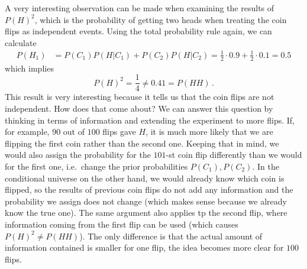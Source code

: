 \begin{ex}
A very interesting observation can be made when examining the results of $P(H)^2$, which is the probability of getting two heads when treating the coin flips as independent events. Using the total probability rule again, we can calculate
\begin{align*}
P(H_1) &= P(C_1) P(H | C_1) + P(C_2) P(H | C_2) = \frac{1}{2} \cdot 0.9 + \frac{1}{2} \cdot 0.1 = 0.5
\end{align*}
which implies
\begin{equation*}
P(H)^2 = \frac{1}{4} \neq 0.41 = P(HH) \, .
\end{equation*}
This result is very interesting because it tells us that the coin flips are not independent. How does that come about? We can answer this question by thinking in terms of information and extending the experiment to more flips. If, for example, $90$ out of $100$ flips gave $H$, it is much more likely that we are flipping the first coin rather than the second one. Keeping that in mind, we would also assign the probability for the $101$-st coin flip differently than we would for the first one, i.e.~change the prior probabilities $P(C_1), P(C_2)$. In the conditional universe on the other hand, we would already know which coin is flipped, so the results of previous coin flips do not add any information and the probability we assign does not change (which makes sense because we already know the true one). The same argument also applies tp the second flip, where information coming from the first flip can be used (which causes $P(H)^2 \neq P(HH)$). The only difference is that the actual amount of information contained is smaller for one flip, the idea becomes more clear for $100$ flips.


\end{ex}

